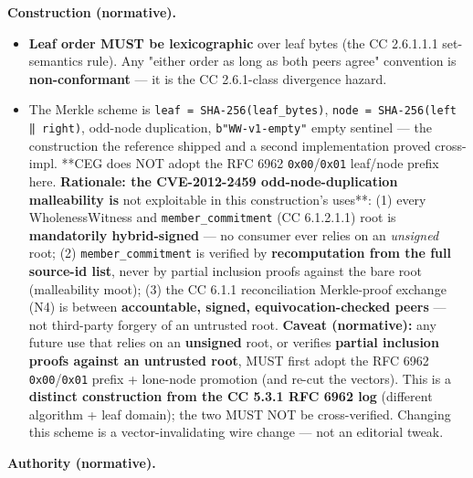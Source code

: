 \documentclass[11pt]{article}
\begin{document}
\textbf{Construction (normative).}

\begin{itemize}\setlength\itemsep{0pt}
\item \textbf{Leaf order MUST be lexicographic} over leaf bytes (the CC 2.6.1.1.1 set-semantics rule). Any "either order as long as both peers agree" convention is \textbf{non-conformant} — it is the CC 2.6.1-class divergence hazard.
\item The Merkle scheme is \texttt{leaf = SHA-256(leaf\_bytes)}, \texttt{node = SHA-256(left ‖ right)}, odd-node duplication, \texttt{b"WW-v1-empty"} empty sentinel — the construction the reference shipped and a second implementation proved cross-impl. **CEG does NOT adopt the RFC 6962 \texttt{0x00}/\texttt{0x01} leaf/node prefix here.\textbf{ Rationale: the CVE-2012-2459 odd-node-duplication malleability is }not exploitable in this construction's uses**: (1) every WholenessWitness and \texttt{member\_commitment} (CC 6.1.2.1.1) root is \textbf{mandatorily hybrid-signed} — no consumer ever relies on an \textit{unsigned} root; (2) \texttt{member\_commitment} is verified by \textbf{recomputation from the full source-id list}, never by partial inclusion proofs against the bare root (malleability moot); (3) the CC 6.1.1 reconciliation Merkle-proof exchange (N4) is between \textbf{accountable, signed, equivocation-checked peers} — not third-party forgery of an untrusted root. \textbf{Caveat (normative):} any future use that relies on an \textbf{unsigned} root, or verifies \textbf{partial inclusion proofs against an untrusted root}, MUST first adopt the RFC 6962 \texttt{0x00}/\texttt{0x01} prefix + lone-node promotion (and re-cut the vectors). This is a \textbf{distinct construction from the CC 5.3.1 RFC 6962 log} (different algorithm + leaf domain); the two MUST NOT be cross-verified. Changing this scheme is a vector-invalidating wire change — not an editorial tweak.
\end{itemize}


\textbf{Authority (normative).}
\end{document}
